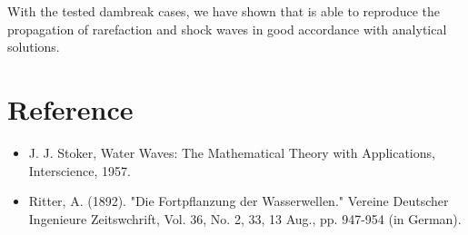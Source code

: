 With the tested dambreak cases, we have shown that  is able to
reproduce the propagation of rarefaction and shock waves in good accordance with
analytical solutions.

\section{Reference}

\begin{itemize}
\item J. J. Stoker, Water Waves: The Mathematical Theory with Applications, Interscience, 1957.
\item Ritter, A. (1892). "Die Fortpflanzung der Wasserwellen." Vereine Deutscher Ingenieure Zeitswchrift, Vol. 36, No. 2, 33,
13 Aug., pp. 947-954 (in German).
\end{itemize}
